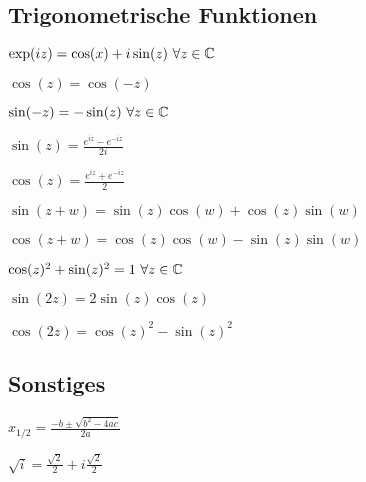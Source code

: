 \subsection{Trigonometrische Funktionen}
\begin{compactenum}
    \item $\exp(iz) = \cos(x) + i \sin(z) \ \forall z \in \mathbb{C}$
    \item
        \begin{inparaitem}
            \item $\cos(z) = \cos(-z)$
            \item $\sin(-z) = - \sin(z) \ \forall z \in \mathbb{C}$
        \end{inparaitem}
    \item
        \begin{inparaitem}
            \item $\sin(z) = \frac{e^{iz} - e^{-iz}}{2i}$
            \item $\cos(z) = \frac{e^{iz} + e^{-iz}}{2}$
        \end{inparaitem}
    \item
        \begin{inparaitem}
            \item $\sin(z + w) = \sin(z) \cos(w) + \cos(z) \sin(w)$
            \item $\cos(z + w) = \cos(z) \cos(w) - \sin(z) \sin(w)$
        \end{inparaitem}
    \item $\cos(z)^2 + \sin(z)^2 = 1 \ \forall z \in \mathbb{C}$
    \item
        \begin{inparaitem}
            \item $\sin(2z) = 2 \sin(z) \cos(z)$
            \item $\cos(2z) = \cos(z)^2 - \sin(z)^2$
        \end{inparaitem}
\end{compactenum}

\subsection{Sonstiges}
\begin{compactitem}
    \item $x_{1 / 2} = \frac{-b \pm \sqrt{b^2 - 4ac}}{2a}$
    \item $\sqrt{i} = \frac{\sqrt{2}}{2} + i \frac{\sqrt{2}}{2}$
\end{compactitem}

